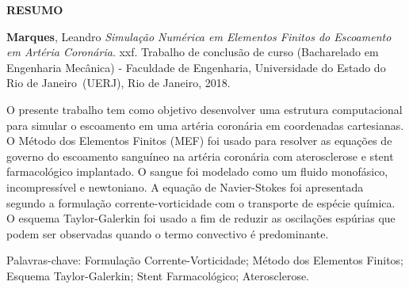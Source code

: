 \begin{center}
\textbf{RESUMO}
\end{center}


$\!$\\

\hspace{-1.3cm}\textbf{Marques}, Leandro \textit{Simulação Numérica em Elementos Finitos do Escoamento em Artéria Coronária}. xxf. Trabalho de conclusão de curso (Bacharelado em Engenharia Mecânica) - Faculdade de Engenharia, Universidade do Estado do Rio de Janeiro~(UERJ), Rio de Janeiro, 2018.

\vspace{.2cm}

\indent O presente trabalho tem como objetivo desenvolver uma estrutura computacional para simular o escoamento em uma artéria coronária em coordenadas cartesianas. O Método dos Elementos Finitos (MEF) foi usado para resolver as equações de governo do escoamento sanguíneo na artéria coronária com aterosclerose e stent farmacológico implantado. O sangue foi modelado como um fluido monofásico, incompressível e newtoniano. A equação de Navier-Stokes foi apresentada segundo a formulação corrente-vorticidade com o transporte de espécie química. O esquema Taylor-Galerkin foi usado a fim de reduzir as oscilações espúrias que podem ser observadas quando o termo convectivo é predominante.

\vspace{1cm}

\hspace{-1.3cm}Palavras-chave: Formulação Corrente-Vorticidade; Método dos Elementos Finitos; Esquema Taylor-Galerkin; Stent Farmacológico; Aterosclerose.
